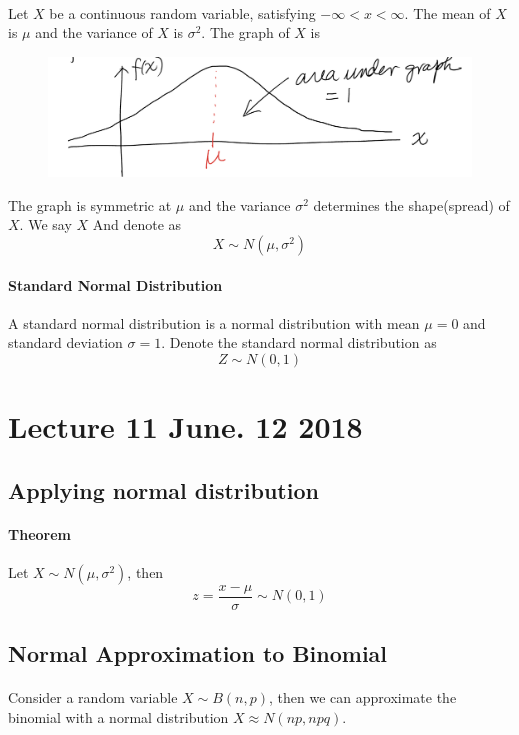 \documentclass{article}
\begin{document}
			\paragraph{} Let $X$ be a continuous random variable, satisfying $-\infty < x < \infty$. The mean of $X$ is $\mu$ and the variance of $X$ is $\sigma^2$. The graph of $X$ is
			\begin{figure}[h]
				\centering
				\includegraphics[width=0.6\linewidth]{fig2.png}
			\end{figure}
			The graph is symmetric at $\mu$ and the variance $\sigma^2$ determines the shape(spread) of $X$. We say $X$  And denote as 
				\[
					X \sim N(\mu, \sigma^2)
				\]
			\paragraph{Standard Normal Distribution} A standard normal distribution is a normal distribution with mean $\mu=0$ and standard deviation $\sigma=1$. Denote the standard normal distribution as
				\[
					Z \sim N(0,1)
				\]
	\section{Lecture 11 June. 12 2018}
		\subsection{Applying normal distribution}
			\paragraph{Theorem} Let $X \sim N(\mu, \sigma^2)$, then
				\[
					z = \frac{x - \mu}{\sigma} \sim N(0, 1)
				\]
		\subsection{Normal Approximation to Binomial}
			\paragraph{} Consider a random variable $X \sim B(n,p)$, then we can approximate the binomial with a normal distribution $X \approx N(np, npq)$.
	
\end{document}
